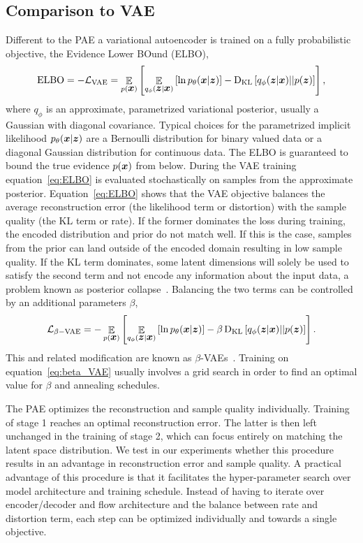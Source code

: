 \documentclass[10pt]{article} \usepackage[accepted]{tmlr}
\DeclareMathOperator{\EE}{\mathbb{E}}
\def\bi#1{\hbox{\boldmath{$#1$}}}
\begin{document}
\subsection{Comparison to VAE}
Different to the PAE a variational autoencoder is trained on a fully probabilistic objective, the Evidence Lower BOund (ELBO),
\begin{equation}
\label{eq:ELBO}
\mathrm{ELBO} = -\mathcal{L}_{\mathrm{VAE}}= \EE_{p({\bi{x}})}\left[\EE_{q_{\phi}(\bi{z}|\bi x)}\left[\ln p_\theta(\bi x|\bi z) \right]- \mathrm{D}_\mathrm{KL}\left[q_\phi(\bi z|\bi x)||p(\bi z)\right]\right],
\end{equation}
where $q_\phi$ is an approximate, parametrized variational posterior, usually a Gaussian with diagonal covariance. Typical choices for the parametrized implicit likelihood $p_\theta(\bi x|\bi z)$ are a Bernoulli distribution for binary valued data or a diagonal Gaussian distribution for continuous data. The ELBO is guaranteed to bound the true evidence $p(\bi x)$ from below.
During the VAE training equation~\ref{eq:ELBO} is evaluated stochastically on samples from the approximate posterior.
Equation~\ref{eq:ELBO} shows that the VAE objective balances the average reconstruction error (the likelihood term or distortion) with the sample quality (the KL term or rate). If the former dominates the loss during training, the encoded distribution and prior do not match well. If this is the case, samples from the prior can land outside of the encoded domain resulting in low sample quality. If the KL term dominates, some latent dimensions will solely be used to satisfy the second term and not encode any information about the input data, a problem known as posterior collapse~\citep{FixElbo}. 
Balancing the two terms can be controlled by an additional parameters $\beta$,
\begin{equation}
    \label{eq:beta_VAE}
    \mathcal{L}_{\beta-\mathrm{VAE}}=- \EE_{p({\bi{x}})}\left[\EE_{q_{\phi}(\bi{z}|\bi x)}\left[\ln p_\theta(\bi x|\bi z) \right]-\beta\, \mathrm{D}_\mathrm{KL}\left[q_\phi(\bi z|\bi x)||p(\bi z)\right]\right].
\end{equation}
This and related modification are known as $\beta$-VAEs~\citep{BowmanVVDJB16, Alemi2016, beta-VAE, Makhzani2015}. Training on equation~\ref{eq:beta_VAE} usually involves a grid search in order to find an optimal value for $\beta$ and annealing schedules. 

The PAE optimizes the reconstruction and sample quality individually. Training of stage 1 reaches an optimal reconstruction error. The latter is then left unchanged in the training of stage 2, which can focus entirely on matching the latent space distribution. We test in our experiments whether this procedure results in an advantage in reconstruction error and sample quality. A practical advantage of this procedure is that it facilitates the hyper-parameter search over model architecture and training schedule. Instead of having to iterate over encoder/decoder and flow architecture and the balance between rate and distortion term, each step can be optimized individually and towards a single objective. 
\end{document}
